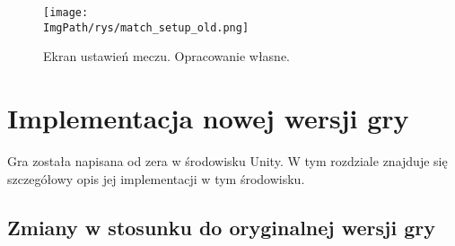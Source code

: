 \documentclass[a4paper,12pt,twoside,openany]{report}
\newcommand{\ImgPath}{.}
\begin{document}
\begin{figure}[!htbp]
	\begin{center}
\centering
\texttt{[image: \\ImgPath/rys/match\_setup\_old.png]}
\end{center}
	\caption{Ekran ustawień meczu. Opracowanie własne.}
	\label{match_setup_old}
\end{figure}


\chapter{Implementacja nowej wersji gry}

Gra została napisana od zera w środowisku Unity. W tym rozdziale znajduje się szczegółowy opis jej implementacji w tym środowisku.

\section{Zmiany w stosunku do oryginalnej wersji gry}
\end{document}
